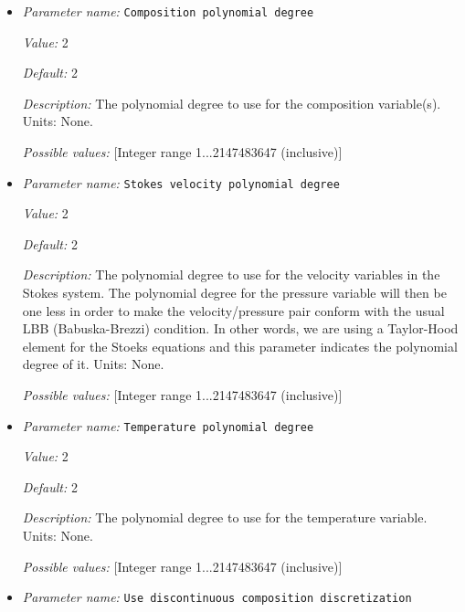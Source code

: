 \begin{itemize}
\item {\it Parameter name:} {\tt Composition polynomial degree}
\label{parameters:Discretization/Composition polynomial degree}


{\it Value:} 2


{\it Default:} 2


{\it Description:} The polynomial degree to use for the composition variable(s). Units: None.


{\it Possible values:} [Integer range 1...2147483647 (inclusive)]
\item {\it Parameter name:} {\tt Stokes velocity polynomial degree}
\label{parameters:Discretization/Stokes velocity polynomial degree}


{\it Value:} 2


{\it Default:} 2


{\it Description:} The polynomial degree to use for the velocity variables in the Stokes system. The polynomial degree for the pressure variable will then be one less in order to make the velocity/pressure pair conform with the usual LBB (Babuska-Brezzi) condition. In other words, we are using a Taylor-Hood element for the Stoeks equations and this parameter indicates the polynomial degree of it. Units: None.


{\it Possible values:} [Integer range 1...2147483647 (inclusive)]
\item {\it Parameter name:} {\tt Temperature polynomial degree}
\label{parameters:Discretization/Temperature polynomial degree}


{\it Value:} 2


{\it Default:} 2


{\it Description:} The polynomial degree to use for the temperature variable. Units: None.


{\it Possible values:} [Integer range 1...2147483647 (inclusive)]
\item {\it Parameter name:} {\tt Use discontinuous composition discretization}
\label{parameters:Discretization/Use discontinuous composition discretization}



\end{itemize}
